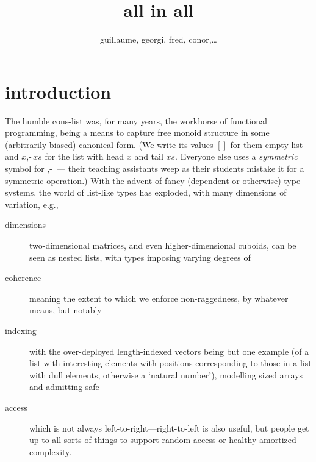 \documentclass{article}
\begin{document}
\title{all in all}
\author{guillaume, georgi, fred, conor,\ldots}
\maketitle

\newcommand{\nil}{[]}
\newcommand{\cons}{\mbox{$,\!\textrm{-}$}}
\newcommand{\xs}{\mathit{xs}}
\newcommand{\ys}{\mathit{ys}}
\newcommand{\ps}{\mathit{ps}}
\newcommand{\qs}{\mathit{qs}}
\newcommand{\rs}{\mathit{rs}}
\newcommand{\D}{\mathbf}
\newcommand{\Ty}{\mathbf{Ty}}
\newcommand{\Li}{\D{List}}
\newcommand{\All}{\D{All}}
\newcommand{\Alll}{\D{Alll}}
\newcommand{\ListR}{\D{ListR}}
\newcommand{\Matrix}{\D{Matrix}}
\newcommand{\IF}{\;\Leftarrow\;}
\newcommand{\hb}{\!:\!}
\newcommand{\ma}{\mathbf{map}}
\newcommand{\fst}{\mathbf{fst}}
\newcommand{\sel}{\downharpoonleft}
\newcommand{\emp}{\varepsilon}
\newcommand{\from}{\leftarrow}
\newcommand{\st}{\;|\;}

\section{introduction}

The humble cons-list was, for many years, the workhorse of functional programming, being a means to capture free monoid structure in some (arbitrarily biased) canonical form. (We write its values $\nil$ for them empty list and $x\cons\xs$ for the list with head $x$ and tail $\xs$. Everyone else uses a \emph{symmetric} symbol for $\cons$ --- their teaching assistants weep as their students mistake it for a symmetric operation.) With the advent of fancy (dependent or otherwise) type systems, the world of list-like types has exploded, with many dimensions of variation, e.g.,
\begin{description}
\item[dimensions] two-dimensional matrices, and even higher-dimensional cuboids, can be seen as nested lists, with types imposing varying degrees of
\item[coherence] meaning the extent to which we enforce non-raggedness, by whatever means, but notably
\item[indexing] with the over-deployed length-indexed vectors being but one example (of a list with interesting elements with positions corresponding to those in a list with dull elements, otherwise a `natural number'), modelling sized arrays and admitting safe
\item[access] which is not always left-to-right---right-to-left is also useful, but people get up to all sorts of things to support random access or healthy amortized complexity.
\end{description}
\end{document}
